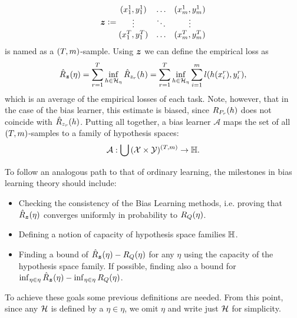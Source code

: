 \begin{equation}
    \nonumber
    \bm{z} \vcentcolon= 
    \begin{matrix}
        (x_1^1, y_1^1) & \ldots & (x_m^1, y_m^1) \\
        \vdots & \ddots & \vdots \\
        (x_1^T, y_1^T) & \ldots & (x_m^T, y_m^T) \\
    \end{matrix}
\end{equation}
is named as a $(T, m)$-sample.
Using $\bm{z}$ we can define the empirical loss as
\begin{equation}\label{eq:biaslearn_emprisk}
    \bemprisk(\eta) = \sum_{r=1}^\ntasks \inf_{\hypf \in \hypspace_\eta} \hat{\risk}_{\sample_r}(\hypf) = \sum_{r=1}^\ntasks \inf_{\hypf \in \hypspace_\eta} \sum_{i=1}^m l(\hypf(x_i^r), y_i^r),
\end{equation}
which is an average of the empirical losses of each task. 
Note, however, that in the case of the bias learner, this estimate is biased, since $R_{P_r}(h)$ does not coincide with $\hat{R}_{z_r}(h)$. 
Putting all together, a bias learner $\mathcal{A}$ maps the set of all $(T, m)$-samples to a family of hypothesis spaces:
\begin{equation}
    \nonumber
    \mathcal{A} : \bigcup {(\mathcal{X}\times \mathcal{Y})^{(T, m)}} \to \mathbb{H}.
\end{equation}
%

To follow an analogous path to that of ordinary learning, the milestones in bias learning theory should include:
\begin{itemize}
    \item Checking the consistency of the Bias Learning methods, i.e. proving that $\hat{R}_{\bm{z}}(\eta)$ converges uniformly in probability to $R_Q(\eta)$.
    \item Defining a notion of capacity of hypothesis space families $\mathbb{H}$.
    \item Finding a bound of $\hat{R}_{\bm{z}}(\eta) - R_Q(\eta)$ for any $\eta$ using the capacity of the hypothesis space family. If possible, finding also a bound for $\inf_{\eta \in \eta}\hat{R}_{\bm{z}}(\eta) - \inf_{\eta \in \eta} R_Q(\eta)$.
\end{itemize}
To achieve these goals some previous definitions are needed. From this point, since any $\mathcal{H}$ is defined by a $\eta \in \eta$, we omit $\eta$ and write just $\mathcal{H}$ for simplicity.
%
